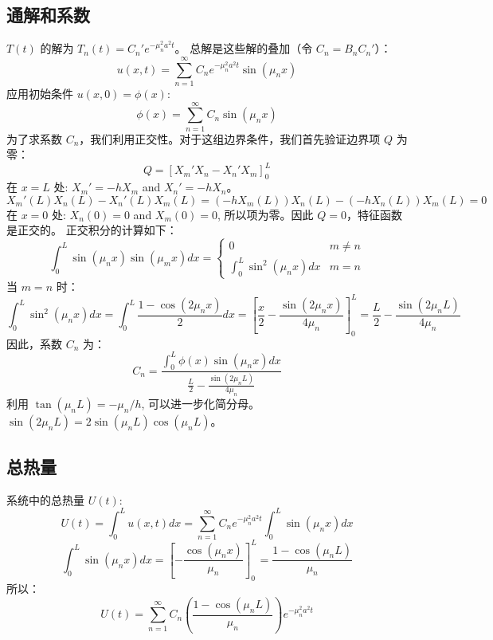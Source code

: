 \documentclass{article}
\begin{document}
	\subsection*{通解和系数}
	$T(t)$ 的解为 $T_n(t) = C_n' e^{-\mu_n^2 a^2 t}$。
	总解是这些解的叠加（令 $C_n = B_n C_n'$）：
	$$ u(x,t) = \sum_{n=1}^{\infty} C_n e^{-\mu_n^2 a^2 t} \sin(\mu_n x) $$
	应用初始条件 $u(x,0) = \phi(x)$:
	$$ \phi(x) = \sum_{n=1}^{\infty} C_n \sin(\mu_n x) $$
	为了求系数 $C_n$，我们利用正交性。对于这组边界条件，我们首先验证边界项 $Q$ 为零：
	$$ Q = [X_m' X_n - X_n' X_m]_0^L $$
	在 $x=L$ 处: $X_m' = -hX_m$ and $X_n' = -hX_n$。
	$$ X_m'(L)X_n(L) - X_n'(L)X_m(L) = (-hX_m(L))X_n(L) - (-hX_n(L))X_m(L) = 0 $$
	在 $x=0$ 处: $X_n(0)=0$ and $X_m(0)=0$, 所以项为零。因此 $Q=0$，特征函数是正交的。
	正交积分的计算如下：
	$$ \int_0^L \sin(\mu_n x) \sin(\mu_m x) dx = 
	\begin{cases}
		0 & m \neq n \\
		\int_0^L \sin^2(\mu_n x) dx & m=n
	\end{cases}
	$$
	当 $m=n$ 时：
	$$ \int_0^L \sin^2(\mu_n x) dx = \int_0^L \frac{1-\cos(2\mu_n x)}{2} dx = \left[ \frac{x}{2} - \frac{\sin(2\mu_n x)}{4\mu_n} \right]_0^L = \frac{L}{2} - \frac{\sin(2\mu_n L)}{4\mu_n} $$
	因此，系数 $C_n$ 为：
	$$ C_n = \frac{\int_0^L \phi(x) \sin(\mu_n x) dx}{\frac{L}{2} - \frac{\sin(2\mu_n L)}{4\mu_n}} $$
	利用 $\tan(\mu_n L) = -\mu_n/h$, 可以进一步化简分母。$\sin(2\mu_n L) = 2\sin(\mu_n L)\cos(\mu_n L)$。
	
	\subsection*{总热量}
	系统中的总热量 $U(t)$:
	$$ U(t) = \int_0^L u(x,t) dx = \sum_{n=1}^{\infty} C_n e^{-\mu_n^2 a^2 t} \int_0^L \sin(\mu_n x) dx $$
	$$ \int_0^L \sin(\mu_n x) dx = \left[ -\frac{\cos(\mu_n x)}{\mu_n} \right]_0^L = \frac{1-\cos(\mu_n L)}{\mu_n} $$
	所以：
	$$ U(t) = \sum_{n=1}^{\infty} C_n \left( \frac{1-\cos(\mu_n L)}{\mu_n} \right) e^{-\mu_n^2 a^2 t} $$
	
	
\end{document}

